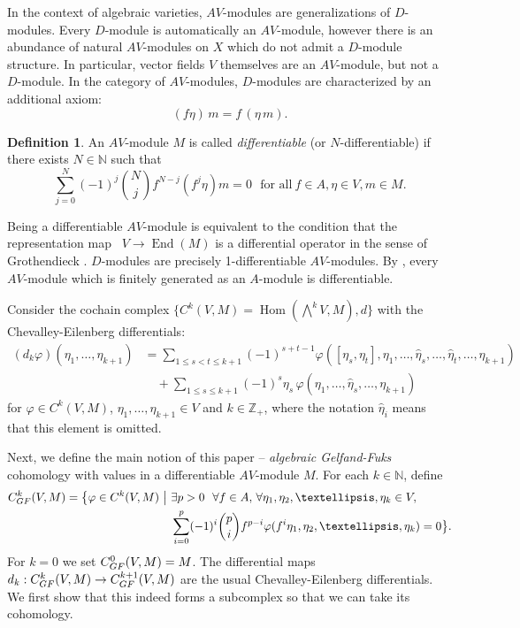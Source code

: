 \documentclass[12pt]{amsart}
\newcommand{\N}{{\mathbb{N}}}
\newcommand{\Z}{{\mathbb{Z}}}
\newcommand{\Hom}{{\operatorname{Hom}}}
\newcommand{\End}{{\operatorname{End}}}
\newcommand{\GF}{{\textup{GF}}}
\newcommand{\vphi}{{\varphi}}
\theoremstyle{definition}
\newtheorem{definition}{Definition}[section]
\begin{document}
In the context of algebraic varieties, $AV$-modules are generalizations of $D$-modules. Every $D$-module is automatically an $AV$-module, however there is an abundance of natural $AV$-modules on $X$ which do not admit a $D$-module structure. In particular, vector fields $V$ themselves are an $AV$-module, but not a $D$-module. In the category of $AV$-modules, $D$-modules are characterized by an additional axiom:
\[
(f \eta)\, m = f\, (\eta \,m).
\]

\begin{definition}\label{definition:differentiable}
An $AV$-module $M$ is called \emph{differentiable} (or $N$-differentiable) if there exists $N \in \N$ such that
\begin{equation}
\sum_{j=0}^N (-1)^j \binom{N}{j} f^{N-j} \left( f^j \eta \right) m = 0
\ \ \ \text{for all} \ f\in A, \eta \in V, m \in M.
\end{equation}
\end{definition}
Being a differentiable $AV$-module is equivalent to the condition that the representation map \ $V \rightarrow \End(M)$ is a differential operator in the sense of Grothendieck \cite{Grothendieck}. 
$D$-modules are precisely 1-differentiable $AV$-modules.
By \cite[Proposition 4.7]{BouazizRocha}, every $AV$-module which is finitely generated as an $A$-module is differentiable. 

Consider the cochain complex $\{ C^k(V, M) = \Hom (\bigwedge^k V, M), d\}$
with the Chevalley-Eilenberg differentials:
\begin{align*}
(d_k\vphi)(\eta_1, \dots, \eta_{k+1}) &= \sum_{1 \leq s< t \leq k+1} (-1)^{s+t-1} \vphi( [\eta_s, \eta_t], \eta_1, \dots, \hat{\eta}_s, \dots, \hat{\eta}_t, \dots, \eta_{k+1}) \\
& \quad + \sum_{1 \leq s \leq k+1} (-1)^s \eta_s \, \vphi(\eta_1, \dots, \hat{\eta}_s, \dots, \eta_{k+1})
\end{align*}
for $\vphi \in C^k(V, M)$, $\eta_1, \dots, \eta_{k+1} \in V$ and $k \in \Z_+$, where the notation $\hat{\eta}_i$ means that this element is omitted.

Next, we define the main notion of this paper -- \emph{algebraic Gelfand-Fuks} cohomology with values in a differentiable $AV$-module $M$. 
 For each $k \in \N$, define
\begin{align*}
C_{\GF}^k(V, M) = \big\{ \vphi \in C^k(V ,M) \ \big| \ & \exists p > 0 \  \ \forall f \in A, \, \forall \eta_1, \eta_2, \dots, \eta_k \in V, \\
&  \sum_{i=0}^p (-1)^i \binom{p}{i} f^{p-i} \vphi(f^i \eta_1, \eta_2, \dots, \eta_k)=0 \big\}.
\end{align*}
For $k=0$ we set $C_{\GF}^0 (V, M) = M$.
The differential maps $d_k: C_\GF^k(V, M) \rightarrow C_\GF^{k+1}(V,M)$ are the
usual  Chevalley-Eilenberg differentials. We first show that this indeed forms a subcomplex so that we can take its cohomology. 
\end{document}
